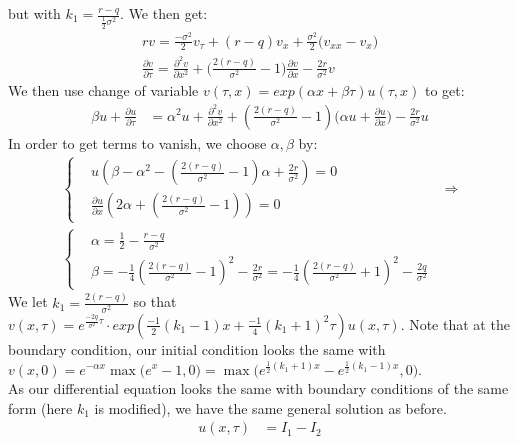\documentclass[12pt,twoside, letter]{exam}
\theoremstyle{definition}
\begin{document}
\begin{solution}
    but with $k_1 = \frac{r-q}{\frac{1}{2}\sigma^2}$. We then get:
    \begin{align*}
       rv= \frac{-\sigma^2}{2} v_\tau + (r-q) v_x + \frac{\sigma^2}{2} \big(v_{xx} - v_x \big) \\
       \frac{\partial v}{\partial \tau} = \frac{\partial^2 v}{\partial x^2}
        + \bigg(\frac{2(r-q)}{\sigma^2} - 1\bigg)\frac{\partial v}{\partial x} - \frac{2r}{\sigma^2}v
    \end{align*}
    We then use change of variable $v(\tau,x) = exp(\alpha x + \beta \tau)u(\tau, x)$ to get:
    \begin{align*}
      \beta u + \frac{\partial u}{\partial \tau} &= \alpha^2u + \frac{\partial^2 v}{\partial x^2} + (\frac{2(r-q)}{\sigma^2} - 1)
        \big(\alpha u + \frac{\partial u}{\partial x} \big) - \frac{2r}{\sigma^2} u
    \end{align*}
    In order to get terms to vanish, we choose $\alpha, \beta$ by:
    \begin{align*}
      \begin{cases}
        &u(\beta - \alpha^2 - (\frac{2(r-q)}{\sigma^2} - 1)\alpha + \frac{2r}{\sigma^2}) = 0 \\
        &\frac{\partial u}{\partial x} (2\alpha + (\frac{2(r-q)}{\sigma^2} - 1)) = 0
      \end{cases}
      &\Rightarrow \\
      \begin{cases}
        &\alpha = \frac{1}{2} - \frac{r-q}{\sigma^2} \\
        &\beta = -\frac{1}{4}(\frac{2(r-q)}{\sigma^2} - 1)^{2}-\frac{2r}{\sigma^2} = -\frac{1}{4}(\frac{2(r-q)}{\sigma^2} + 1)^{2}-\frac{2q}{\sigma^2}
      \end{cases}
    \end{align*}
    We let $k_1 = \frac{2(r-q)}{\sigma^2}$ so that $v(x,\tau) = e^{\frac{-2q}{\sigma^2}\tau}\cdot exp(\frac{-1}{2}(k_1 - 1) x + \frac{-1}{4}(k_1 + 1)^2 \tau)u(x, \tau)$.
    Note that at the boundary condition, our initial condition looks the same with \\
    $v(x, 0) = e^{-\alpha x}\max\bigg(e^{x}-1,0 \bigg) = \max\bigg(e^{\frac{1}{2}(k_1 + 1)x} - e^{\frac{1}{2}(k_1 - 1) x}, 0 \bigg)$. \\
    As our differential equation looks the same with boundary conditions of the same form (here $k_1$ is modified), we have the same general solution as before.
    \begin{align*}
     u(x,\tau) &= I_1 - I_2 \\

\end{align*}
\end{solution}
\end{document}
